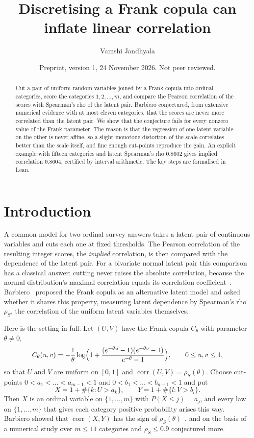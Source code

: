\documentclass[11pt]{amsart}
\title[Discretising a Frank copula can inflate correlation]{Discretising a Frank copula can inflate linear correlation}
\author{Vamshi Jandhyala}
\date{Preprint, version 1, 24 November 2026. Not peer reviewed.}
\theoremstyle{definition}
\DeclareMathOperator{\corr}{corr}
\newcommand{\rs}{\rho_S}
\begin{document}
\begin{abstract}
Cut a pair of uniform random variables joined by a Frank copula into ordinal categories, score the categories
$1,2,\dots,m$, and compare the Pearson correlation of the scores with Spearman's rho of the latent pair. Barbiero
conjectured, from extensive numerical evidence with at most eleven categories, that the scores are never more
correlated than the latent pair. We show that the conjecture fails for every nonzero value of the Frank parameter.
The reason is that the regression of one latent variable on the other is never affine, so a slight monotone
distortion of the scale correlates better than the scale itself, and fine enough cut-points reproduce the gain. An
explicit example with fifteen categories and latent Spearman's rho $0.8602$ gives implied correlation $0.8604$,
certified by interval arithmetic. The key steps are formalised in Lean.
\end{abstract}

\maketitle

\section{Introduction}

A common model for two ordinal survey answers takes a latent pair of continuous variables and cuts each one at fixed
thresholds. The Pearson correlation of the resulting integer scores, the \emph{implied} correlation, is then compared
with the dependence of the latent pair. For a bivariate normal latent pair this comparison has a classical answer:
cutting never raises the absolute correlation, because the normal distribution's maximal correlation equals its
correlation coefficient~\cite{Lancaster}. Barbiero~\cite{Barbiero} proposed the Frank copula as an alternative latent
model and asked whether it shares this property, measuring latent dependence by Spearman's rho $\rs$, the
correlation of the uniform latent variables themselves.

Here is the setting in full. Let $(U,V)$ have the Frank copula $C_\theta$ with parameter $\theta\ne0$,
\begin{equation}\label{eq:frank}
C_\theta(u,v)=-\frac1\theta\log\Bigl(1+\frac{(e^{-\theta u}-1)(e^{-\theta v}-1)}{e^{-\theta}-1}\Bigr),
\qquad 0\le u,v\le1,
\end{equation}
so that $U$ and $V$ are uniform on $[0,1]$ and $\corr(U,V)=\rs(\theta)$. Choose cut-points $0<a_1<\dots<a_{m-1}<1$
and $0<b_1<\dots<b_{n-1}<1$ and put
\[
X=1+\#\{k : U>a_k\},\qquad Y=1+\#\{l : V>b_l\}.
\]
Then $X$ is an ordinal variable on $\{1,\dots,m\}$ with $P(X\le j)=a_j$, and every law on $\{1,\dots,m\}$
that gives each category positive probability arises this way. Barbiero showed that $\corr(X,Y)$ has the sign of $\rs(\theta)$~\cite[Theorem~2]{Barbiero},
and on the basis of a numerical study over $m\le11$ categories and $\rs\le0.9$ conjectured more.
\end{document}
